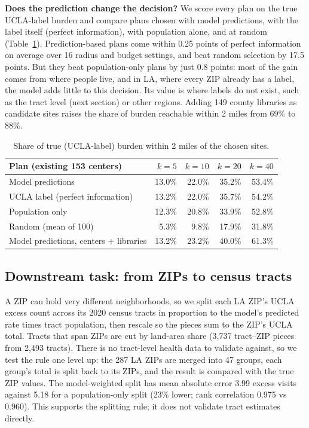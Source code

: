 \documentclass[10pt]{article}
\begin{document}
\textbf{Does the prediction change the decision?} We score every plan on the true UCLA-label burden and compare plans chosen with model predictions, with the label itself (perfect information), with population alone, and at random (Table~\ref{tab:siting}). Prediction-based plans come within 0.25 points of perfect information on average over 16 radius and budget settings, and beat random selection by 17.5 points. But they beat population-only plans by just 0.8 points: most of the gain comes from where people live, and in LA, where every ZIP already has a label, the model adds little to this decision. Its value is where labels do not exist, such as the tract level (next section) or other regions. Adding 149 county libraries as candidate sites raises the share of burden reachable within 2 miles from 69\% to 88\%.

\begin{table}[!htbp]
\centering\small
\caption{Share of true (UCLA-label) burden within 2 miles of the chosen sites.}
\label{tab:siting}
\begin{tabular}{@{}lrrrr@{}}
\toprule
Plan (existing 153 centers) & $k=5$ & $k=10$ & $k=20$ & $k=40$ \\
\midrule
Model predictions & 13.0\% & 22.0\% & 35.2\% & 53.4\% \\
UCLA label (perfect information) & 13.2\% & 22.0\% & 35.7\% & 54.2\% \\
Population only & 12.3\% & 20.8\% & 33.9\% & 52.8\% \\
Random (mean of 100) & 5.3\% & 9.8\% & 17.9\% & 31.8\% \\
\midrule
Model predictions, centers + libraries & 13.2\% & 23.2\% & 40.0\% & 61.3\% \\
\bottomrule
\end{tabular}
\end{table}

\subsection{Downstream task: from ZIPs to census tracts}
A ZIP can hold very different neighborhoods, so we split each LA ZIP's UCLA excess count across its 2020 census tracts in proportion to the model's predicted rate times tract population, then rescale so the pieces sum to the ZIP's UCLA total. Tracts that span ZIPs are cut by land-area share (3,737 tract--ZIP pieces from 2,493 tracts). There is no tract-level health data to validate against, so we test the rule one level up: the 287 LA ZIPs are merged into 47 groups, each group's total is split back to its ZIPs, and the result is compared with the true ZIP values. The model-weighted split has mean absolute error 3.99 excess visits against 5.18 for a population-only split (23\% lower; rank correlation 0.975 vs 0.960). This supports the splitting rule; it does not validate tract estimates directly.
\end{document}
